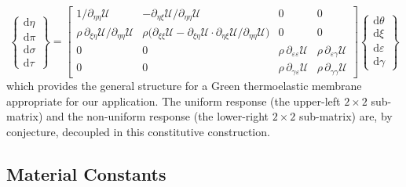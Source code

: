 \begin{equation}
\left\{ \begin{matrix}
\mathrm{d} \eta \\ \mathrm{d} \pi \\
\mathrm{d} \sigma \\ \mathrm{d} \tau
\end{matrix} \right\} = \begin{bmatrix}
1 / \partial_{\eta\eta} \mathcal{U} & 
-\partial_{\eta\xi} \mathcal{U} / \partial_{\eta\eta} \mathcal{U} & 
0 & 0 \\ 
\rho \, \partial_{\xi\eta} \mathcal{U} / \partial_{\eta\eta} \mathcal{U} & 
\rho \bigl( \partial_{\xi\xi} \mathcal{U} - \partial_{\xi\eta} \mathcal{U} \!\cdot\! \partial_{\eta\xi} \mathcal{U} / \partial_{\eta\eta} \mathcal{U} \bigr) & 0 & 0 \\
0 & 0 & \rho \, \partial_{\varepsilon\varepsilon} \mathcal{U} & 
\rho \, \partial_{\varepsilon\gamma} \mathcal{U} \\
0 & 0 & \rho \, \partial_{\gamma\varepsilon} \mathcal{U} & 
\rho \, \partial_{\gamma\gamma} \mathcal{U} 
\end{bmatrix} 
\left\{ \begin{matrix}
\mathrm{d}\theta \\ \mathrm{d} \xi \\
\mathrm{d} \varepsilon \\ \mathrm{d} \gamma
\end{matrix} \right\}  
\label{Helmholtz2Duncoupled}
\end{equation}
which provides the general structure for a Green thermo\-elastic membrane appropriate for our application.  The uniform response (the upper-left $2 \times 2$ sub-matrix) and the non-uniform response (the lower-right $2 \times 2$ sub-matrix) are, by conjecture, decoupled in this constitutive construction.

\subsection{Material Constants}
\label{secMaterialConstants}

